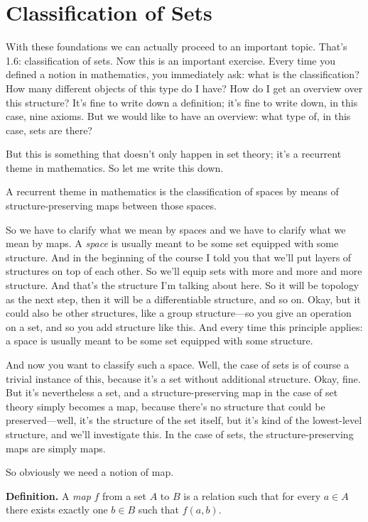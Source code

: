 \section{Classification of Sets}

With these foundations we can actually proceed to an important topic. That's 1.6: classification of sets. Now this is an important exercise. Every time you defined a notion in mathematics, you immediately ask: what is the classification? How many different objects of this type do I have? How do I get an overview over this structure? It's fine to write down a definition; it's fine to write down, in this case, nine axioms. But we would like to have an overview: what type of, in this case, sets are there?

But this is something that doesn't only happen in set theory; it's a recurrent theme in mathematics. So let me write this down.

A recurrent theme in mathematics is the classification of spaces by means of structure-preserving maps between those spaces.

So we have to clarify what we mean by spaces and we have to clarify what we mean by maps. A \emph{space} is usually meant to be some set equipped with some structure. And in the beginning of the course I told you that we'll put layers of structures on top of each other. So we'll equip sets with more and more and more structure. And that's the structure I'm talking about here. So it will be topology as the next step, then it will be a differentiable structure, and so on. Okay, but it could also be other structures, like a group structure---so you give an operation on a set, and so you add structure like this. And every time this principle applies: a space is usually meant to be some set equipped with some structure.

And now you want to classify such a space. Well, the case of sets is of course a trivial instance of this, because it's a set without additional structure. Okay, fine. But it's nevertheless a set, and a structure-preserving map in the case of set theory simply becomes a map, because there's no structure that could be preserved---well, it's the structure of the set itself, but it's kind of the lowest-level structure, and we'll investigate this. In the case of sets, the structure-preserving maps are simply maps.

So obviously we need a notion of map.

\textbf{Definition.} A \emph{map} $f$ from a set $A$ to $B$ is a relation such that for every $a \in A$ there exists exactly one $b \in B$ such that $f(a, b)$.


